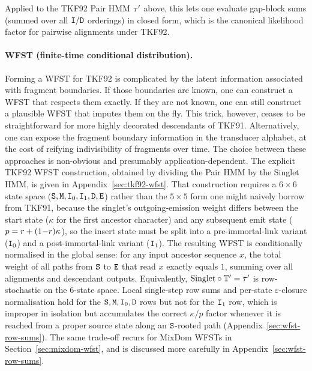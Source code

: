 Applied to the TKF92 Pair HMM $\tau'$ above, this lets one evaluate
gap-block sums (summed over all ${\tt I}/{\tt D}$ orderings) in closed form,
which is the canonical likelihood factor for pairwise alignments under TKF92.

\paragraph{WFST (finite-time conditional distribution).}
Forming a WFST for TKF92 is complicated by the latent information associated with fragment boundaries. If those boundaries are known, one can construct a WFST that respects them exactly. If they are not known, one can still construct a plausible WFST that imputes them on the fly. This trick, however, ceases to be straightforward for more highly decorated descendants of TKF91.
Alternatively, one can expose the fragment boundary information in the transducer alphabet, at the cost of reifying indivisibility of fragments over time.
The choice between these approaches is non-obvious and presumably application-dependent.
The explicit TKF92 WFST construction, obtained by dividing the Pair HMM by the Singlet HMM, is given in Appendix~\ref{sec:tkf92-wfst}.
That construction requires a $6{\times}6$ state space (${\tt S},{\tt M},{\tt I}_0,{\tt I}_1,{\tt D},{\tt E}$) rather than the $5{\times}5$ form one might naively borrow from TKF91, because the singlet's outgoing-emission weight differs between the start state ($\kappa$ for the first ancestor character) and any subsequent emit state ($p = r + (1{-}r)\kappa$), so the insert state must be split into a pre-immortal-link variant (${\tt I}_0$) and a post-immortal-link variant (${\tt I}_1$).
The resulting WFST is conditionally normalised in the global sense: for any input ancestor sequence $x$, the total weight of all paths from ${\tt S}$ to ${\tt E}$ that read $x$ exactly equals $1$, summing over all alignments and descendant outputs.  Equivalently, $\text{Singlet}\circ\mathbb{T}'=\tau'$ is row-stochastic on the $6$-state space.  Local single-step row sums and per-state $\varepsilon$-closure normalisation hold for the ${\tt S},{\tt M},{\tt I}_0,{\tt D}$ rows but not for the ${\tt I}_1$ row, which is improper in isolation but accumulates the correct $\kappa/p$ factor whenever it is reached from a proper source state along an ${\tt S}$-rooted path (Appendix~\ref{sec:wfst-row-sums}).
\ifdefined\MIXDOMPAPER
The same trade-off recurs for MixDom WFSTs in Section~\ref{sec:mixdom-wfst}, and is discussed more carefully in Appendix~\ref{sec:wfst-row-sums}.

